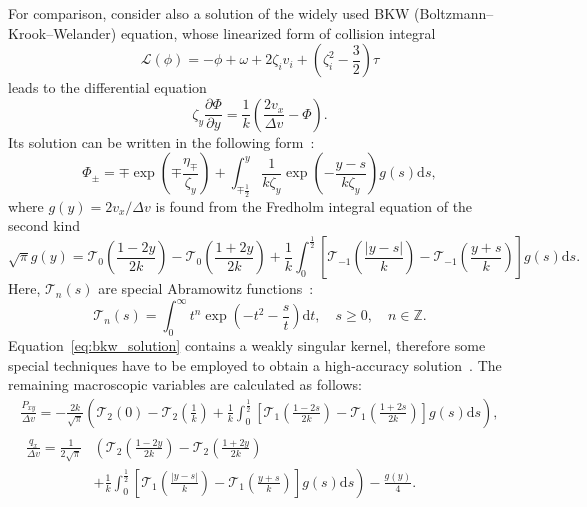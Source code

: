 \documentclass[]{elsarticle} %
\newcommand{\dd}{\mathrm{d}}
\newcommand{\pder}[2][]{\frac{\partial#1}{\partial#2}}
\begin{document}
For comparison, consider also a solution of the widely used BKW (Boltzmann--Krook--Welander) equation,
whose linearized form of collision integral
\begin{equation}\label{eq:linear_bkw}
    \mathcal{L}(\phi) = -\phi + \omega + 2\zeta_i v_i + \left(\zeta_i^2-\frac32\right)\tau
\end{equation}
leads to the differential equation
\begin{equation}\label{eq:linear_bkw_equation}
    \zeta_y \pder[\Phi]{y} = \frac1{k}\left( \frac{2v_x}{\Delta{v}} - \Phi \right).
\end{equation}
Its solution can be written in the following form~\citep{Willis1962}:
\begin{equation}\label{eq:bkw_solution}
    \Phi_\pm = \mp \exp\left(\mp\frac{\eta_\mp}{\zeta_y}\right) +
        \int_{\mp\frac12}^y \frac1{k\zeta_y} \exp \left(-\frac{y-s}{k\zeta_y}\right) g(s) \dd{s},
\end{equation}
where \(g(y) = 2v_x/\Delta v\) is found from the Fredholm integral equation of the second kind
\begin{equation}\label{eq:bkw_g_equation}
    \sqrt{\pi} g(y) = \mathcal{T}_0 \left(\frac{1-2y}{2k}\right) - \mathcal{T}_0 \left(\frac{1+2y}{2k}\right)
        + \frac1k \int_0^{\frac12} \left[ \mathcal{T}_{-1}\left(\frac{|y-s|}{k}\right)
        - \mathcal{T}_{-1}\left(\frac{y+s}{k}\right) \right] g(s) \dd{s}.
\end{equation}
Here, \(\mathcal{T}_n(s)\) are special Abramowitz functions~\citep{Abramowitz1972}:
\begin{equation}\label{eq:Abramowitz}
    \mathcal{T}_n(s) = \int_0^\infty t^n \exp\left(-t^2-\frac{s}{t}\right) \dd t,
    \quad s\ge0, \quad n \in \mathbb{Z}.
\end{equation}
Equation~\eqref{eq:bkw_solution} contains a weakly singular kernel,
therefore some special techniques have to be employed to obtain
a high-accuracy solution~\cite{Luo2015, Luo2016}.
The remaining macroscopic variables are calculated as follows:
\begin{gather}
    \frac{P_{xy}}{\Delta v} = -\frac{2k}{\sqrt{\pi}} \left(
        \mathcal{T}_2(0)-\mathcal{T}_2\left(\frac1k\right)
        + \frac1k\int_0^{\frac12}\left[
            \mathcal{T}_1\left(\frac{1-2s}{2k}\right)-\mathcal{T}_1\left(\frac{1+2s}{2k}\right)
        \right]g(s)\dd{s}
        \right), \label{eq:bkw_macro_Pxy} \\
    \begin{aligned}
    \frac{q_x}{\Delta v} = \frac1{2\sqrt{\pi}}&\left(
        \mathcal{T}_2\left(\frac{1-2y}{2k}\right) - \mathcal{T}_2\left(\frac{1+2y}{2k}\right)\right. \\
        &+\left. \frac1k\int_0^{\frac12}\left[
            \mathcal{T}_1\left(\frac{|y-s|}k\right)-\mathcal{T}_1\left(\frac{y+s}k\right)
        \right]g(s)\dd{s}
        \right) - \frac{g(y)}4.
    \end{aligned} \label{eq:bkw_macro_qx}
\end{gather}
\end{document}
